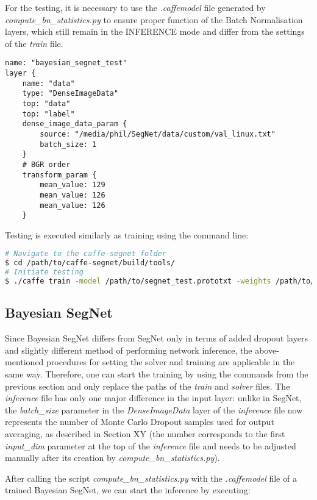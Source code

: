 For the testing, it is necessary to use the \textit{.caffemodel} file generated by \textit{compute\_bn\_statistics.py} to ensure proper function of the Batch Normalisation layers, which still remain in the INFERENCE mode and differ from the settings of the \textit{train} file.

\begin{lstlisting}
name: "bayesian_segnet_test"
layer {
	name: "data"
	type: "DenseImageData"
	top: "data"
	top: "label"
	dense_image_data_param {
		source: "/media/phil/SegNet/data/custom/val_linux.txt"	
		batch_size: 1
	}
	# BGR order
	transform_param {
		mean_value: 129
		mean_value: 126
		mean_value: 126 
	}  
\end{lstlisting}

Testing is executed similarly as training using the command line:

\begin{lstlisting}[language=bash]
# Navigate to the caffe-segnet folder
$ cd /path/to/caffe-segnet/build/tools/
# Initiate testing
$ ./caffe train -model /path/to/segnet_test.prototxt -weights /path/to/final_weights.caffemodel
\end{lstlisting}

\subsection{Bayesian SegNet}

Since Bayesian SegNet differs from SegNet only in terms of added dropout layers and slightly different method of performing network inference, the above-mentioned procedures for setting the solver and training are applicable in the same way. Therefore, one can start the training by using the commands from the previous section and only replace the paths of the \textit{train} and \textit{solver} files. The \textit{inference} file has only one major difference in the input layer: unlike in SegNet, the \textit{batch\_size} parameter in the \textit{DenseImageData} layer of the \textit{inference} file now represents the number of Monte Carlo Dropout samples used for output averaging, as described in Section XY (the number corresponds to the first \textit{input\_dim} parameter at the top of the \textit{inference} file and needs to be adjusted manually after its creation by \textit{compute\_bn\_statistics.py}).

After calling the script \textit{compute\_bn\_statistics.py} with the \textit{.caffemodel} file of a trained Bayesian SegNet, we can start the inference by executing:

